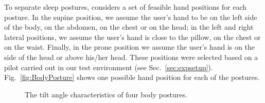 
To separate sleep postures, {\systemname} considers a set of feasible hand positions for each posture. In the supine position, we assume the user's hand to be on the left side of the body, on the abdomen, on the chest or on the head; in the left and right lateral positions, we assume the user's hand is close to the pillow, on the chest or on the waist. Finally, in the prone position we assume the user's hand is on the side of the head or above his/her head. These positions were selected based on a pilot carried out in our test environment (see Sec.~\ref{sec:expsetup}). Fig.~\ref{fig:BodyPosture} shows one possible hand position for each of the postures.

\begin{figure}
	\centering
	\hfill
	\hfill
	\caption{The tilt angle characteristics of four body postures.}
	\label{fig:posture}
\end{figure}


